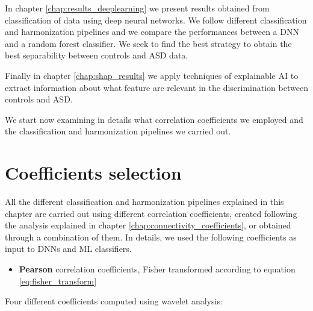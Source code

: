 \documentclass[11pt]{report}
\begin{document}
In chapter \ref{chap:results_deeplearning} we present results obtained from classification of data using deep neural networks. We follow different classification and harmonization pipelines and we compare the performances between a DNN and a random forest classifier.
We seek to find the best strategy to obtain the best separability between controls and ASD data.

Finally in chapter \ref{chap:shap_results} we apply techniques of explainable AI to extract information about what feature are relevant in the discrimination between controls and ASD.

\hfill

We start now examining in details what correlation coefficients we employed and the classification and harmonization pipelines we carried out.



\section{Coefficients selection}\label{sec:coefficient_selection}

All the different classification and harmonization pipelines explained in this chapter are carried out using different correlation coefficients, created following the analysis explained in chapter \ref{chap:connectivity_coefficients}, or obtained through a combination of them. 
In details, we used the following coefficients as input to DNNs and ML classifiers.

\begin{itemize}
\item \textbf{Pearson} correlation coefficients, Fisher transformed according to equation \ref{eq:fisher_transform} 
\end{itemize}


\noindent Four different coefficients computed using wavelet analysis:
\end{document}
